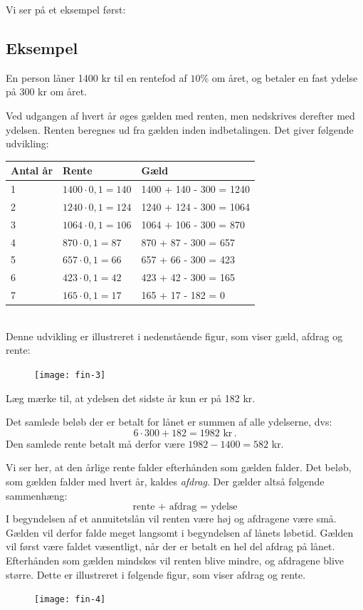 \documentclass[12pt,oneside,a4paper]{article}
\begin{document}
Vi ser på et eksempel først:
\begin{tcolorbox}
\subsection*{Eksempel}
En person låner 1400 kr til en rentefod af $10\%$ om året, og betaler en fast
ydelse på 300 kr om året.

Ved udgangen af hvert år øges gælden med renten, men nedskrives derefter med
ydelsen. Renten beregnes ud fra gælden inden indbetalingen.  Det giver
følgende udvikling:
\\

\begin{tabular}{|l|l|l|}
    \hline
    \textbf{Antal år} & \textbf{Rente} & \textbf{Gæld} \\
    \hline
    1 & $1400\cdot 0,1 = 140$ & 1400 + 140 - 300 = 1240 \\
    \hline
    2 & $1240\cdot 0,1 = 124$ & 1240 + 124 - 300 = 1064 \\
    \hline
    3 & $1064\cdot 0,1 = 106$ & 1064 + 106 - 300 =  870 \\
    \hline
    4 & $870\cdot 0,1 = 87$ & 870 + 87 - 300 = 657 \\
    \hline
    5 & $657\cdot 0,1 = 66$ & 657 + 66 - 300 = 423 \\
    \hline
    6 & $423\cdot 0,1 = 42$ & 423 + 42 - 300 = 165 \\
    \hline
    7 & $165\cdot 0,1 = 17$ & 165 + 17 - 182 = 0 \\
    \hline
\end{tabular}
\\

Denne udvikling er illustreret i nedenstående figur, som viser gæld, afdrag og rente:
\begin{figure}[H]
    \centering
    \texttt{[image: fin-3]}
\end{figure}

Læg mærke til, at ydelsen det sidste år kun er på 182 kr.

Det samlede beløb der er betalt for lånet er summen af alle ydelserne, dvs:
\[
6\cdot 300 + 182 = 1982 \,\,\mbox{kr}\,.
\]
Den samlede rente betalt må derfor være $1982 - 1400 = 582$ kr.

\end{tcolorbox}

Vi ser her, at den årlige rente falder efterhånden som gælden falder. Det
beløb, som gælden falder med hvert år, kaldes \emph{afdrag}. Der gælder
altså følgende sammenhæng:
\[
\mbox{rente + afdrag = ydelse}
\]
I begyndelsen af et annuitetslån vil renten være høj og afdragene være små.
Gælden vil derfor falde meget langsomt i begyndelsen af lånets løbetid.  Gælden
vil først være faldet væsentligt, når der er betalt en hel del afdrag på lånet.
Efterhånden som gælden mindskes vil renten blive mindre, og afdragene blive
større. Dette er illustreret i følgende figur, som viser afdrag og rente.
\begin{figure}[H]
    \centering
    \texttt{[image: fin-4]}
\end{figure}
\end{document}
